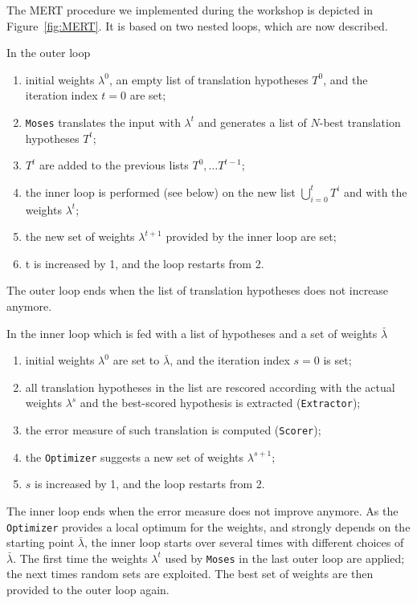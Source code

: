 \documentclass[10pt]{report}
\theoremstyle{plain}
\begin{document}
{The MERT procedure we implemented during the workshop is depicted in Figure~\ref{fig:MERT}. 
It is based on two nested loops, which are now described.

In the outer loop 
\begin{enumerate}
\item initial weights $\lambda^0$, an empty list of translation hypotheses $T^0$, and the iteration index $t=0$ are set;
\item {\tt Moses} translates the input with  $\lambda^t$ and generates a list of $N$-best translation hypotheses $T^t$;
\item $T^t$ are added to the previous lists $T^0, \ldots T^{t-1}$;
\item the inner loop is performed (see below) on the new list $\bigcup_{i=0}^{t}T^i$ and with the weights $\lambda^t$;
\item the  new set of weights $\lambda^{t+1}$ provided by the inner loop are set;
\item t is increased by 1, and the loop restarts from 2.
\end{enumerate}
The outer loop ends when the list of translation hypotheses does not increase anymore.

In the inner loop which  is fed with a list of hypotheses and a set of weights $\bar \lambda$
\begin{enumerate}
\item initial weights $\lambda^0$ are set to $\bar \lambda$, and the iteration index $s=0$ is set;
\item all translation hypotheses in the list are rescored according with the actual weights $\lambda^s$
and the best-scored hypothesis is extracted ({\tt Extractor});
\item the error measure of such translation is computed ({\tt Scorer});
\item the {\tt Optimizer} suggests a new set of weights $\lambda^{s+1}$;
\item $s$ is increased by 1, and the loop restarts from 2.
\end{enumerate}
The inner loop ends when the error measure does not improve anymore.
As the {\tt Optimizer} provides a local optimum for the weights, and strongly depends on the starting point $\bar \lambda$, the inner loop starts over several  times with different choices of $\bar \lambda$. The first time the weights $\lambda^t$ used by {\tt Moses} in the last outer loop are applied; the next times random sets are exploited. The best set of weights are then provided to the outer loop again.

}
\end{document}
